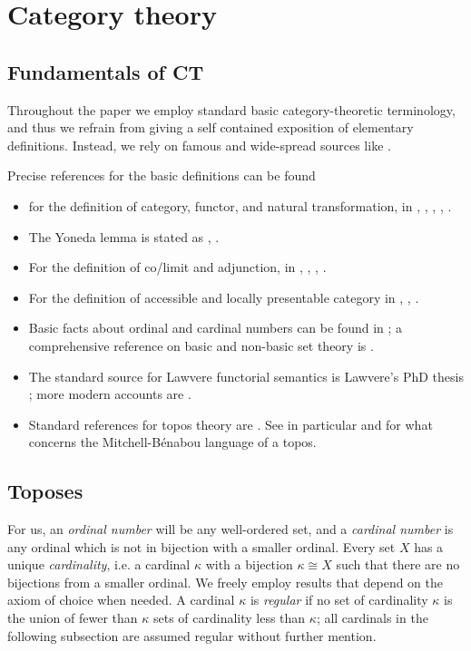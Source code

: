 \section{Category theory}
\subsection{Fundamentals of CT}
Throughout the paper we employ standard basic category-theoretic terminology, and thus we refrain from giving a self contained exposition of elementary definitions. Instead, we rely on famous and wide-spread sources like \cite{Bor1,Bor2,McL,riehlcontext,leinster2014basic,simmons2011introduction}.

Precise references for the basic definitions can be found
\begin{itemize}
  \item for the definition of category, functor, and natural transformation, in \cite[1.2.1]{Bor1}, \cite[I.2]{McL}, \cite[1.2.2]{Bor1}, \cite[I.3]{McL}, \cite[1.3.1]{Bor1}.
  \item The Yoneda lemma is stated as \cite[1.3.3]{Bor1}, \cite[III.2]{McL}.
  \item For the definition of co/limit and adjunction, in \cite[2.6.2]{Bor1}, \cite[III.3]{McL}, \cite[2.6.6]{Bor1}, \cite[III.4]{McL}.
  \item For the definition of accessible and locally presentable category in \cite[5.3.1]{Bor2}, \cite[5.2.1]{Bor2}, \cite{Adamek1994}.%
  \item Basic facts about ordinal and cardinal numbers can be found in \cite[]{}; a comprehensive reference on basic and non-basic set theory is \cite{jech2013set}.
  \item The standard source for Lawvere functorial semantics is Lawvere's PhD thesis \cite{lawvere1963functorial}; more modern accounts are \cite{hyland2007category}.
  \item Standard references for topos theory are \cite{mac1992sheaves,JohnstonePT}. See in particular \cite[VI.5]{mac1992sheaves} and \cite[5.4]{JohnstonePT} for what concerns the Mitchell-Bénabou language of a topos.
\end{itemize}
\subsection{Toposes}\leavevmode
{}
For us, an \emph{ordinal number} will be any well\hyp{}ordered set, and a \emph{cardinal number} is any ordinal which is not in bijection with a smaller ordinal. Every set $X$ has a unique \emph{cardinality}, i.e. a cardinal $\kappa$ with a bijection $\kappa \cong X$ such that there are no bijections from a smaller ordinal. We freely employ results that depend on the axiom of choice when needed. A cardinal $\kappa$ is \emph{regular} if no set of cardinality $\kappa$ is the union of fewer than $\kappa$ sets of cardinality less than $\kappa$; all cardinals in the following subsection are assumed regular without further mention.

